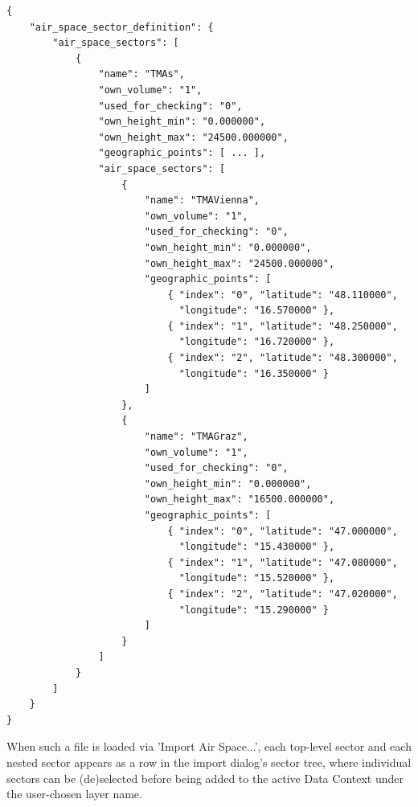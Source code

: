 \begin{lstlisting}[basicstyle=\small\ttfamily]
{
    "air_space_sector_definition": {
        "air_space_sectors": [
            {
                "name": "TMAs",
                "own_volume": "1",
                "used_for_checking": "0",
                "own_height_min": "0.000000",
                "own_height_max": "24500.000000",
                "geographic_points": [ ... ],
                "air_space_sectors": [
                    {
                        "name": "TMAVienna",
                        "own_volume": "1",
                        "used_for_checking": "0",
                        "own_height_min": "0.000000",
                        "own_height_max": "24500.000000",
                        "geographic_points": [
                            { "index": "0", "latitude": "48.110000",
                              "longitude": "16.570000" },
                            { "index": "1", "latitude": "48.250000",
                              "longitude": "16.720000" },
                            { "index": "2", "latitude": "48.300000",
                              "longitude": "16.350000" }
                        ]
                    },
                    {
                        "name": "TMAGraz",
                        "own_volume": "1",
                        "used_for_checking": "0",
                        "own_height_min": "0.000000",
                        "own_height_max": "16500.000000",
                        "geographic_points": [
                            { "index": "0", "latitude": "47.000000",
                              "longitude": "15.430000" },
                            { "index": "1", "latitude": "47.080000",
                              "longitude": "15.520000" },
                            { "index": "2", "latitude": "47.020000",
                              "longitude": "15.290000" }
                        ]
                    }
                ]
            }
        ]
    }
}
\end{lstlisting}

When such a file is loaded via 'Import Air Space...', each top-level sector and each nested sector appears as a row in the import dialog's sector tree, where individual sectors can be (de)selected before being added to the active Data Context under the user-chosen layer name. \\
